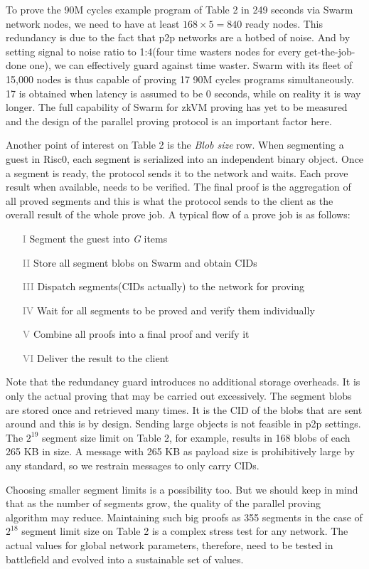 \documentclass[a4paper, 10pt]{article}
\begin{document}
\par
To prove the 90M cycles example program of Table 2 in 249 seconds via Swarm network nodes, we need to have at least $168 \times 5 = 840$ ready nodes. This redundancy is due to the fact that p2p networks are a hotbed of noise. And by setting signal to noise ratio to 1:4(four time wasters nodes for every get-the-job-done one), we can effectively guard against time waster. Swarm with its fleet of 15,000 nodes is thus capable of proving 17 90M cycles programs simultaneously. 17 is obtained when latency is assumed to be 0 seconds, while on reality it is way longer. The full capability of Swarm for zkVM proving has yet to be measured and the design of the parallel proving protocol is an important factor here.
\par
Another point of interest on Table 2 is the \textit{Blob size} row. When segmenting a guest in Risc0, each segment is serialized into an independent binary object. Once a segment is ready, the protocol sends it to the network and waits. Each prove result when available, needs to be verified. The final proof is the aggregation of all proved segments and this is what the protocol sends to the client as the overall result of the whole prove job. A typical flow of a prove job is as follows:
\begin{itemize}
    \item[\textcolor{gray}{I}] Segment the guest into \textit{G} items
    \item[\textcolor{gray}{II}] Store all segment blobs on Swarm and obtain CIDs
    \item[\textcolor{gray}{III}] Dispatch segments(CIDs actually) to the network for proving
    \item[\textcolor{gray}{IV}] Wait for all segments to be proved and verify them individually
    \item[\textcolor{gray}{V}] Combine all proofs into a final proof and verify it
    \item[\textcolor{gray}{VI}] Deliver the result to the client
\end{itemize}
Note that the redundancy guard introduces no additional storage overheads. It is only the actual proving that may be carried out excessively. The segment blobs are stored once and retrieved many times. It is the CID of the blobs that are sent around and this is by design. Sending large objects is not feasible in p2p settings. The $2^{19}$ segment size limit on Table 2, for example, results in 168 blobs of each 265 KB in size. A message with 265 KB as payload size is prohibitively large by any standard, so we restrain messages to only carry CIDs. 
\par
Choosing smaller segment limits is a possibility too. But we should keep in mind that as the number of segments grow, the quality of the parallel proving algorithm may reduce. Maintaining such big proofs as 355 segments in the case of $2^{18}$ segment limit size on Table 2 is a complex stress test for any network. The actual values for global network parameters, therefore, need to be tested in battlefield and evolved into a sustainable set of values.
\end{document}
